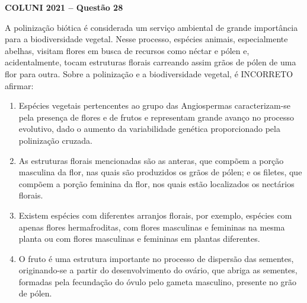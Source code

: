 \textbf{COLUNI 2021 -- Questão 28}\par\medskip A polinização biótica é considerada um serviço ambiental de grande importância para a biodiversidade vegetal. Nesse processo, espécies animais, especialmente abelhas, visitam flores em busca de recursos como néctar e pólen e, acidentalmente, tocam estruturas florais carreando assim grãos de pólen de uma flor para outra. Sobre a polinização e a biodiversidade vegetal, é INCORRETO afirmar:\begin{enumerate}
\item Espécies vegetais pertencentes ao grupo das Angiospermas caracterizam-se pela presença de flores e de
       frutos e representam grande avanço no processo evolutivo, dado o aumento da variabilidade genética
       proporcionado pela polinização cruzada.
\item As estruturas florais mencionadas são as anteras, que compõem a porção masculina da flor, nas quais
       são produzidos os grãos de pólen; e os filetes, que compõem a porção feminina da flor, nos quais estão
       localizados os nectários florais.
\item Existem espécies com diferentes arranjos florais, por exemplo, espécies com apenas flores hermafroditas,
       com flores masculinas e femininas na mesma planta ou com flores masculinas e femininas em plantas
       diferentes.
\item O fruto é uma estrutura importante no processo de dispersão das sementes, originando-se a partir do
       desenvolvimento do ovário, que abriga as sementes, formadas pela fecundação do óvulo pelo gameta
       masculino, presente no grão de pólen.\end{enumerate}
